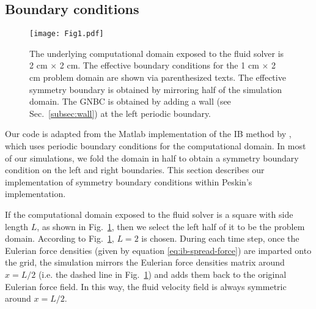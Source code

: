 \documentclass[%
 aip,
 amsmath,amssymb,
 reprint,
 floatfix
]{revtex4-1}
\begin{document}
\subsection {Boundary conditions} \label{sec:bc}
\begin{figure}
\centering
\texttt{[image: Fig1.pdf]}
\caption{\footnotesize {The underlying computational domain exposed to the fluid solver is 2 cm $\times$ 2 cm. The effective boundary conditions for the 1 cm $\times$ 2 cm problem domain are shown via parenthesized texts. The effective symmetry boundary is obtained by mirroring half of the simulation domain. The GNBC is obtained by adding a wall (see Sec.~\ref{subsec:wall}) at the left periodic boundary.}}
\label{fig:domain}
\end{figure}

Our code is adapted from the Matlab implementation of the IB method by \citet{ib_matlab}, which uses periodic boundary conditions for the computational domain. In most of our simulations, we fold the domain in half to obtain a symmetry boundary condition on the left and right boundaries. This section describes our implementation of symmetry boundary conditions within Peskin's implementation. 

If the computational domain exposed to the fluid solver is a square with side length $L$, as shown in Fig.~\ref{fig:domain}, then we select the left half of it to be the problem domain. According to Fig.~\ref{fig:domain}, $L=2$ is chosen. During each time step, once the Eulerian force densities (given by equation \ref{eq:ib-spread-force}) are imparted onto the grid, the simulation mirrors the Eulerian force densities matrix around $x = L/2$ (i.e. the dashed line in Fig.~\ref{fig:domain}) and adds them back to the original Eulerian force field. In this way, the fluid velocity field is always symmetric around $x = L/2$. 
\end{document}
